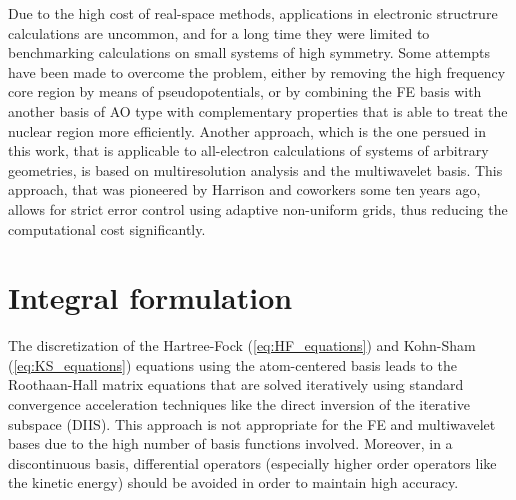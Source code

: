 Due to the high cost of real-space methods, applications in electronic structrure calculations are
uncommon, and for a long time they were limited to benchmarking calculations on small systems 
of high symmetry\cite{Laaksonen:1983-1,Laaksonen:1983-2,Laaksonen:1983-3,Kobus:1996}. Some 
attempts have been made to overcome the problem, either by 
removing the high frequency core region by means of pseudopotentials, or by combining the FE basis 
with another basis of AO type with complementary properties that is able to treat the nuclear region 
more efficiently\cite{Kurashige:2007,Watson:2008,Kurashige:2010,Losilla:2012}. Another approach, 
which is the one persued in this work,
that is applicable to all-electron calculations of systems of arbitrary geometries, is based on 
multiresolution analysis and the multiwavelet basis. This approach, that was pioneered by Harrison and 
coworkers\cite{Harrison_basic:2004} some ten years ago, allows for strict error control using adaptive 
non-uniform grids, thus reducing the computational cost significantly.

\section{Integral formulation}
The discretization of the Hartree-Fock (\ref{eq:HF_equations}) and Kohn-Sham (\ref{eq:KS_equations})
equations using the atom-centered basis leads to the Roothaan-Hall\cite{Roothaan:1951,Hall:1951} 
matrix 
equations that are solved iteratively using standard convergence acceleration techniques like
the direct inversion of the iterative subspace (DIIS)\cite{Pulay:1980}. This approach is not 
appropriate
for the FE and multiwavelet bases due to the high number of basis functions involved. Moreover,
in a discontinuous basis, differential operators (especially higher order operators like
the kinetic energy) should be avoided in order to maintain high accuracy\cite{Harrison_basic:2004}.

